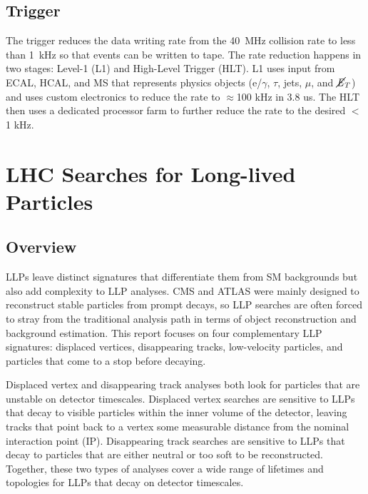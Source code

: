 \documentclass[12pt]{article}
\begin{document}
\subsection{Trigger}
    The trigger reduces the data writing rate from the \SI{40}{\mega\hertz} collision rate to less than \SI{1}{\kilo\hertz} so that events can be written to tape. The rate reduction happens in two stages: Level-1 (L1) and High-Level Trigger (HLT). L1 uses input from ECAL, HCAL, and MS that represents physics objects ($\mathrm{e}$/$\gamma$, $\tau$, jets, $\mu$, and $\cancel{\it{E}}_{T}$) and uses custom electronics to reduce the rate to $\approx$100 kHz in 3.8 us. The HLT then uses a dedicated processor farm to further reduce the rate to the desired $<$ 1 kHz.

\section{LHC Searches for Long-lived Particles}
\subsection{Overview}
    LLPs leave distinct signatures that differentiate them from SM backgrounds but also add complexity to LLP analyses. CMS and ATLAS were mainly designed to reconstruct stable particles from prompt decays, so LLP searches are often forced to stray from the traditional analysis path in terms of object reconstruction and background estimation. This report focuses on four complementary LLP signatures: displaced vertices, disappearing tracks, low-velocity particles, and particles that come to a stop before decaying.

    Displaced vertex and disappearing track analyses both look for particles that are unstable on detector timescales. Displaced vertex searches are sensitive to LLPs that decay to visible particles within the inner volume  of the detector, leaving tracks that point back to a vertex some measurable distance from the nominal interaction point (IP). Disappearing track searches are sensitive to LLPs that decay to particles that are either neutral or too soft to be reconstructed. Together, these two types of analyses cover a wide range of lifetimes and topologies for LLPs that decay on detector timescales.
\end{document}
